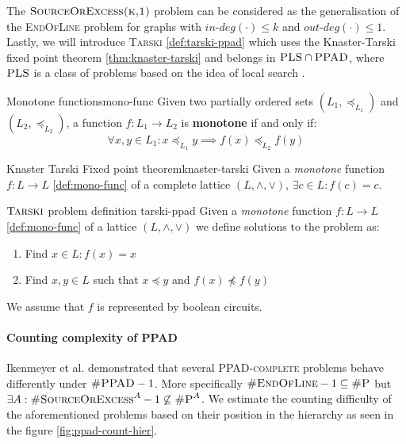 The $\textsc{SourceOrExcess(k,1)}$ problem can be considered as the generalisation of the \textsc{EndOfLine}
problem for graphs with $\textit{in-deg}(\cdot) \leq k$ and $\textit{out-deg}(\cdot) \leq 1$.
Lastly, we will introduce \textsc{Tarski} \ref{def:tarski-ppad}
which uses the Knaster-Tarski fixed point theorem \ref{thm:knaster-tarski} and
belongs in $\textsc{PLS} \cap \textsc{PPAD}$,
where  $\textsc{PLS}$ is a class of problems based on the idea of local search \cite{johnson_HowEasyLocal_1988}.
%
%
\begin{definitionbox}{Monotone functions}{mono-func}
    Given two partially ordered sets $(L_1, \preceq_{L_1})$ and $(L_2, \preceq_{L_2})$, a function
    $f: L_1 \to L_2$ is \textbf{monotone} if and only if:
    $$
        \forall x,y \in L_1: x \preceq_{L_1} y \implies f(x) \preceq_{L_2} f(y)
    $$
\end{definitionbox}
%     
%
\begin{theorembox}{Knaster Tarski Fixed point theorem\cite{bronislaw_TheoremeFunctionsDensembles_1928, fearnley_FasterAlgorithmFinding_2022}}{knaster-tarski}
    Given a \textit{monotone} function $f: L \to L$ \ref{def:mono-func} of a complete lattice $(L, \wedge, \vee)$,  $\exists c \in L: f(c) = c$.
\end{theorembox}

\begin{definitionbox}{$\textnormal{\textsc{Tarski}}$ problem definition \cite{fearnley_FasterAlgorithmFinding_2022}}{tarski-ppad}
    Given a \textit{monotone} function $f: L \to L$ \ref{def:mono-func} of a lattice $(L, \wedge, \vee)$
    we define solutions to the problem as:
    \begin{enumerate}
        \item Find $x \in L: f(x) = x$
        \item Find $x,y \in L$ such that $x \preceq y$ and $f(x) \not\preceq f(y)$
    \end{enumerate}
    We assume that $f$ is represented by boolean circuits.
\end{definitionbox}
%
\paragraph{Counting complexity of PPAD}
\label{par:count-ppad}


Ikenmeyer et al. \cite{ikenmeyer_WhatWhatNot_2022} demonstrated that several \textsc{PPAD-complete}
problems behave differently under $\textsc{\#PPAD} -1$. More specifically
$\textsc{\#EndOfLine} - 1 \subseteq \textsc{\#P}$ but $\exists A: \textsc{\#SourceOrExcess}^A  - 1\not\subseteq \textsc{\#P}^A$.
We estimate the counting difficulty of the aforementioned problems based on their position in the hierarchy as seen in the figure \ref{fig:ppad-count-hier}.

